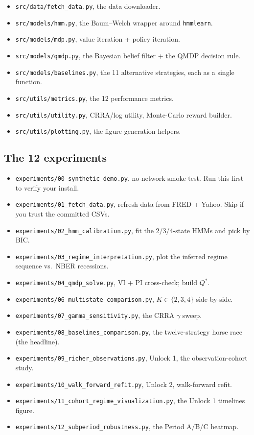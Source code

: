 \documentclass[11pt]{article}
\begin{document}
\begin{itemize}
  \item \texttt{src/data/fetch\_data.py}, the data downloader.
  \item \texttt{src/models/hmm.py}, the Baum--Welch wrapper around \texttt{hmmlearn}.
  \item \texttt{src/models/mdp.py}, value iteration + policy iteration.
  \item \texttt{src/models/qmdp.py}, the Bayesian belief filter + the QMDP decision rule.
  \item \texttt{src/models/baselines.py}, the 11 alternative strategies, each as a single function.
  \item \texttt{src/utils/metrics.py}, the 12 performance metrics.
  \item \texttt{src/utils/utility.py}, CRRA/log utility, Monte-Carlo reward builder.
  \item \texttt{src/utils/plotting.py}, the figure-generation helpers.
\end{itemize}

\subsection{The 12 experiments}

\begin{itemize}
  \item \texttt{experiments/00\_synthetic\_demo.py}, no-network smoke test. Run this first to verify your install.
  \item \texttt{experiments/01\_fetch\_data.py}, refresh data from FRED + Yahoo. Skip if you trust the committed CSVs.
  \item \texttt{experiments/02\_hmm\_calibration.py}, fit the 2/3/4-state HMMs and pick by BIC.
  \item \texttt{experiments/03\_regime\_interpretation.py}, plot the inferred regime sequence vs.\ NBER recessions.
  \item \texttt{experiments/04\_qmdp\_solve.py}, VI + PI cross-check; build $Q^*$.
  \item \texttt{experiments/06\_multistate\_comparison.py}, $K \in \{2, 3, 4\}$ side-by-side.
  \item \texttt{experiments/07\_gamma\_sensitivity.py}, the CRRA $\gamma$ sweep.
  \item \texttt{experiments/08\_baselines\_comparison.py}, the twelve-strategy horse race (the headline).
  \item \texttt{experiments/09\_richer\_observations.py}, Unlock 1, the observation-cohort study.
  \item \texttt{experiments/10\_walk\_forward\_refit.py}, Unlock 2, walk-forward refit.
  \item \texttt{experiments/11\_cohort\_regime\_visualization.py}, the Unlock 1 timelines figure.
  \item \texttt{experiments/12\_subperiod\_robustness.py}, the Period A/B/C heatmap.
\end{itemize}
\end{document}
